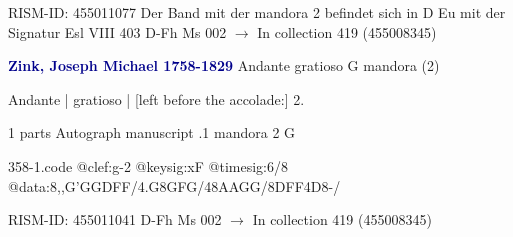 \documentclass[twocolumn]{book}
\begin{document}
\newline RISM-ID: 455011077
\newline Der Band mit der mandora 2 befindet sich in D Eu mit der Signatur Esl VIII 403
\newline D-Fh  Ms 002
\newline $\rightarrow$ In collection 419 (455008345)

\newline \par \vspace{7pt} \textcolor{darkblue}{\textbf{Zink, Joseph Michael  1758-1829}}
\newline Andante gratioso  G  
\newline mandora (2)
\newline \begin{itshape} Andante | gratioso | [left before the accolade:] 2.\end{itshape} 
\newline \textcolor{darkblue}{}  1 parts  
\newline Autograph manuscript
.1  mandora 2  G  
\begin{filecontents*}{358-1.code}
@clef:g-2
@keysig:xF
@timesig:6/8
@data:8,,G'GGDFF/4.G8GFG/48AAGG/8DFF4D8-/
\end{filecontents*}
\newline
%

\newline RISM-ID: 455011041
\newline D-Fh  Ms 002
\newline $\rightarrow$ In collection 419 (455008345)
\end{document}
